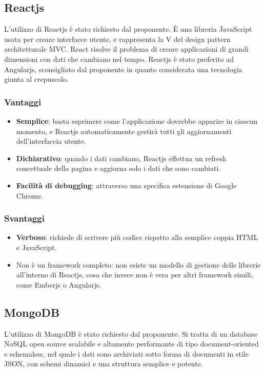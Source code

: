 \subsection{Reactjs}
L'utilizzo di Reactjs \`e stato richiesto dal proponente. \`E una libreria JavaScript usata per creare interfacce utente, e rappresenta la V del design pattern architetturale MVC. React risolve il problema di creare applicazioni di grandi dimensioni con dati che cambiano nel tempo.
Reactjs \`e stato preferito ad Angularjs, sconsigliato dal proponente in quanto considerata una tecnologia giunta al crepuscolo.
\subsubsection{Vantaggi}
\begin{itemize}
\item \textbf{Semplice}: basta esprimere come l'applicazione dovrebbe apparire in ciascun momento, e Reactjs automaticamente gestir\`a tutti gli aggiornamenti dell'interfaccia utente.
\item \textbf{Dichiarativo}: quando i dati cambiano, Reactjs effettua un refresh concettuale della pagina e aggiorna solo i dati che sono cambiati.
\item \textbf{Facilit\`a di debugging}: attraverso una specifica estensione di Google Chrome.
\end{itemize}
\subsubsection{Svantaggi}
\begin{itemize}
\item \textbf{Verboso}: richiede di scrivere pi\`u codice rispetto alla semplice coppia HTML e JavaScript.
\item{Non \`e un framework completo}: non esiste un modello di gestione delle librerie all'interno di Reactjs, cosa che invece non \`e vera per altri framework simili, come Emberjs o Angularjs.
\end{itemize}
\subsection{MongoDB}
L'utilizzo di MongoDB \`e stato richiesto dal proponente. Si tratta di un database NoSQL open source scalabile e altamente performante di tipo document-oriented e schemaless, nel quale i dati sono archiviati sotto forma di documenti in stile JSON, con schemi dinamici e una struttura semplice e potente.
